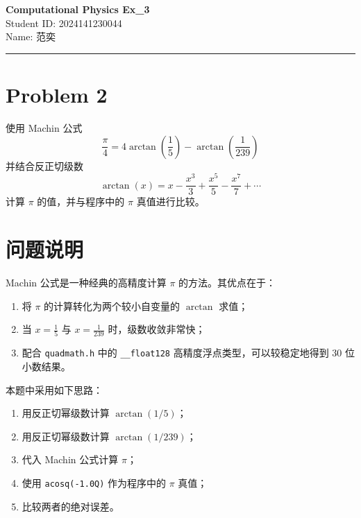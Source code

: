 \documentclass[12pt,a4paper]{article}
\newcommand{\HomeworkTitle}{Computational Physics Ex\_3}
\newcommand{\StudentID}{2024141230044}
\newcommand{\StudentName}{范奕}
\begin{document}
\begin{center}
    {\LARGE \textbf{\HomeworkTitle}}\\[1.2em]
    {\large Student ID: \StudentID}\\[0.5em]
    {\large Name: \StudentName}
\end{center}

\vspace{0.5em}
\noindent\rule{\textwidth}{0.8pt}
\vspace{0.5em}

\section*{Problem 2}

使用 Machin 公式
\[
\frac{\pi}{4}=4\arctan\left(\frac{1}{5}\right)-\arctan\left(\frac{1}{239}\right)
\]
并结合反正切级数
\[
\arctan(x)=x-\frac{x^3}{3}+\frac{x^5}{5}-\frac{x^7}{7}+\cdots
\]
计算 $\pi$ 的值，并与程序中的 $\pi$ 真值进行比较。

\newpage
\tableofcontents
\newpage

\section{问题说明}

Machin 公式是一种经典的高精度计算 $\pi$ 的方法。其优点在于：
\begin{enumerate}[label=\arabic*)]
    \item 将 $\pi$ 的计算转化为两个较小自变量的 $\arctan$ 求值；
    \item 当 $x=\frac{1}{5}$ 与 $x=\frac{1}{239}$ 时，级数收敛非常快；
    \item 配合 \texttt{quadmath.h} 中的 \texttt{\_\_float128} 高精度浮点类型，可以较稳定地得到 30 位小数结果。
\end{enumerate}

本题中采用如下思路：
\begin{enumerate}[label=\arabic*)]
    \item 用反正切幂级数计算 $\arctan(1/5)$；
    \item 用反正切幂级数计算 $\arctan(1/239)$；
    \item 代入 Machin 公式计算 $\pi$；
    \item 使用 \texttt{acosq(-1.0Q)} 作为程序中的 $\pi$ 真值；
    \item 比较两者的绝对误差。
\end{enumerate}
\end{document}
